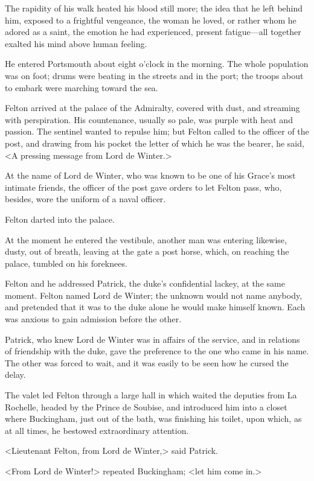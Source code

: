 The rapidity of his walk heated his blood still more; the idea that he left behind him, exposed to a frightful vengeance, the woman he loved, or rather whom he adored as a saint, the emotion he had experienced, present fatigue—all together exalted his mind above human feeling. 

He entered Portsmouth about eight o'clock in the morning. The whole population was on foot; drums were beating in the streets and in the port; the troops about to embark were marching toward the sea. 

Felton arrived at the palace of the Admiralty, covered with dust, and streaming with perspiration. His countenance, usually so pale, was purple with heat and passion. The sentinel wanted to repulse him; but Felton called to the officer of the post, and drawing from his pocket the letter of which he was the bearer, he said, <A pressing message from Lord de Winter.> 

At the name of Lord de Winter, who was known to be one of his Grace's most intimate friends, the officer of the post gave orders to let Felton pass, who, besides, wore the uniform of a naval officer. 

Felton darted into the palace. 

At the moment he entered the vestibule, another man was entering likewise, dusty, out of breath, leaving at the gate a post horse, which, on reaching the palace, tumbled on his foreknees. 

Felton and he addressed Patrick, the duke's confidential lackey, at the same moment. Felton named Lord de Winter; the unknown would not name anybody, and pretended that it was to the duke alone he would make himself known. Each was anxious to gain admission before the other. 

Patrick, who knew Lord de Winter was in affairs of the service, and in relations of friendship with the duke, gave the preference to the one who came in his name. The other was forced to wait, and it was easily to be seen how he cursed the delay. 

The valet led Felton through a large hall in which waited the deputies from La Rochelle, headed by the Prince de Soubise, and introduced him into a closet where Buckingham, just out of the bath, was finishing his toilet, upon which, as at all times, he bestowed extraordinary attention. 

<Lieutenant Felton, from Lord de Winter,> said Patrick. 

<From Lord de Winter!> repeated Buckingham; <let him come in.> 

